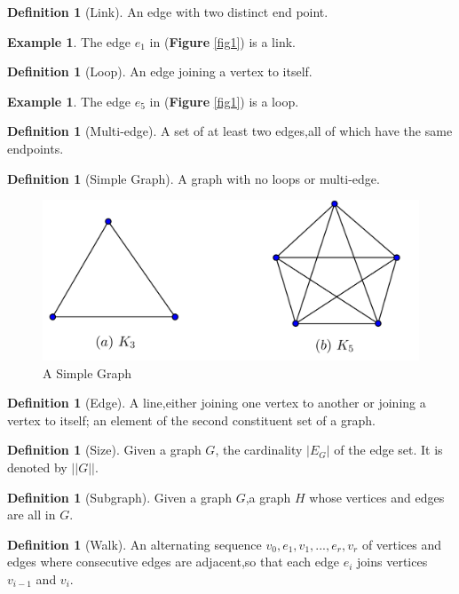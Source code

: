\documentclass[	DIV=calc,paper=a4,fontsize=11pt]{scrartcl}	 					%
\theoremstyle{definition}
\newtheorem{defn}[thm]{Definition}
\newtheorem{exmp}[thm]{Example}
\theoremstyle{plain}
\theoremstyle{remark}
\begin{document}
\begin{defn}[Link]
An edge with two distinct end point.
\end{defn}

\begin{exmp}
The edge $e_1$ in (\textbf{Figure} \ref{fig1}) is a link.
\end{exmp}

\begin{defn}[Loop]
An edge joining a vertex to itself.
\end{defn}

\begin{exmp}
The edge $e_5$ in (\textbf{Figure} \ref{fig1}) is a loop.
\end{exmp}

\begin{defn}[Multi-edge]
 A set of at least two edges,all of which have the same endpoints.
\end{defn}
\begin{defn}[Simple Graph]
A graph with no loops or multi-edge.
\end{defn}
\begin{figure}[hbt!]
\centering
\includegraphics[width=.5\textwidth]{simplegraph.png}
\caption{A Simple Graph}\label{fig2}
\end{figure}

\begin{defn}[Edge]
A line,either joining one vertex to another or joining a vertex to itself; an element of the second constituent set of a graph.
\end{defn}

\begin{defn}[Size]
Given a graph $G$, the cardinality $|E_G|$ of the edge set. It is denoted by $||G||$.
\end{defn}

\begin{defn}[Subgraph]
Given a graph $G$,a graph $H$ whose vertices and edges are all in $G$.
\end{defn}

\begin{defn}[Walk]
An alternating sequence $v_0, e_1, v_1,...,e_r, v_r$ of vertices and edges where consecutive edges are adjacent,so that each edge $e_i$ joins vertices $v_{i−1}$ and $v_i$.
\end{defn}
\end{document}
